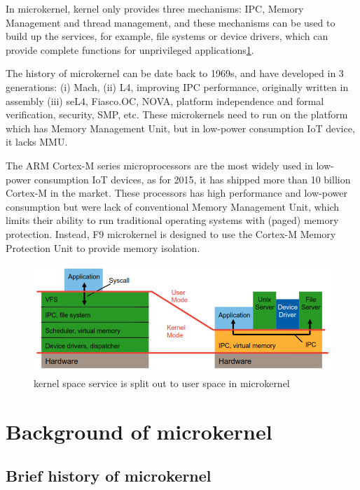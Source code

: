 \documentclass[10pt,preprint,nocopyrightspace]{sigplanconf}
\begin{document}
In microkernel, kernel only provides three mechanisms: IPC, Memory Management and thread management, and these mechanisms can be used to build up the services, for example, file systems or device drivers, which can provide complete functions for unprivileged applications\ref{fig:kernel_diff}.

The history of microkernel can be date back to 1969s, and have developed in 3 generations: (i) Mach, (ii) L4, improving IPC performance, originally written in assembly (iii) seL4, Fiasco.OC, NOVA, platform independence and formal verification, security, SMP, etc. These microkernels need to run on the platform which has Memory Management Unit, but in low-power consumption IoT device, it lacks MMU.

The ARM Cortex-M series microprocessors are the most widely used in low-power consumption IoT devices, as for 2015, it has shipped more than 10 billion Cortex-M in the market\cite{arm2015cortex}. These processors has high performance and low-power consumption but were lack of conventional Memory Management Unit, which limits their ability to run traditional operating systems with (paged) memory protection. Instead, F9 microkernel is designed to use the Cortex-M Memory Protection Unit to provide memory isolation. 

\begin{figure}[H]
	\begin{center}
		\includegraphics[width=\linewidth]{picture/kernel_diff.png}
	\end{center}
	\caption{kernel space service is split out to user space in microkernel \cite{heiser2012}}
	\label{fig:kernel_diff}
\end{figure}


\section{Background of microkernel}

\subsection{Brief history of microkernel}
\end{document}
